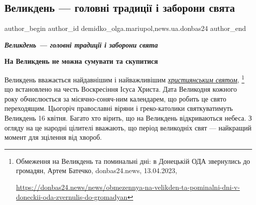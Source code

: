  
 
 
 
 
 
\subsection{Великдень — головні традиції і заборони свята}
\label{sec:15_04_2023.stz.news.ua.donbas24.1.velykden_golovni_tradycii_zaborony_svjata}
 
\ifcmt
 author_begin
   author_id demidko_olga.mariupol,news.ua.donbas24
 author_end
\fi

\begin{center}
  \em\color{blue}\bfseries\Large
Великдень — головні традиції і заборони свята
\end{center}

\begin{center}
\textbf{\color{blue} На Великдень не можна сумувати та скупитися}
\end{center}

Великдень вважається найдавнішим і найважливішим \href{https://donbas24.news/news/obmezennya-na-velikden-ta-pominalni-dni-v-doneckii-oda-zvernulis-do-gromadyan}{\emph{християнським святом}},%
\footnote{Обмеження на Великдень та поминальні дні: в Донецькій ОДА звернулись до громадян, Артем Батечко, donbas24.news, 13.04.2023, \par\url{https://donbas24.news/news/obmezennya-na-velikden-ta-pominalni-dni-v-doneckii-oda-zvernulis-do-gromadyan}}
що встановлено на честь Воскресіння Ісуса Христа. Дата Великодня кожного року
обчислюється за місячно-соняч\hyp{}ним календарем, що робить це свято переходящим.
Цьогоріч православні віряни і греко-католики святкуватимуть Великдень 16
квітня. Багато хто вірить, що на Великдень відкриваються небеса. З огляду на це
народні цілителі вважають, що період великодніх свят — найкращий момент для
зцілення від хвороб.

